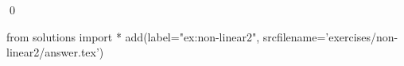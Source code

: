 
\begin{ex} 
  \label{ex:non-linear2}
  
  \qed
\end{ex} 
\begin{python0}
from solutions import *
add(label="ex:non-linear2",
    srcfilename='exercises/non-linear2/answer.tex') 
\end{python0}

